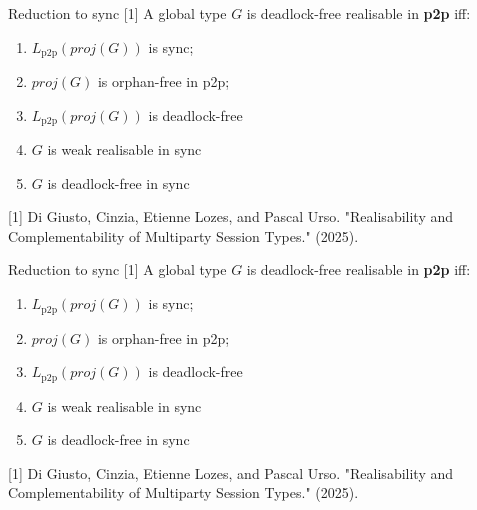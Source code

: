 \documentclass{beamer}
\begin{document}



\begin{frame}{Reduction to sync [1]}
	\vspace{1.5cm}
	A global type $G$ is deadlock-free realisable in \textbf{p2p} iff:
	\begin{enumerate}
		\item $L_{\text{p2p}}(proj(G))$ is sync;
		\item $proj(G)$ is orphan-free in p2p; %
		\item $L_{\text{p2p}}(proj(G))$ is deadlock-free
		\item $G$ is weak realisable in sync
		\item $G$ is deadlock-free in sync
	\end{enumerate}
	
	\vspace{1.5cm}

	\small{[1] Di Giusto, Cinzia, Etienne Lozes, and Pascal Urso. "Realisability and Complementability of Multiparty Session Types." (2025).}
\end{frame}

\begin{frame}{Reduction to sync [1]}
	\vspace{1.5cm}
	A global type $G$ is deadlock-free realisable in \textbf{p2p} iff:
	\begin{enumerate}
		\item $L_{\text{p2p}}(proj(G))$ is sync;
		\item $proj(G)$ is orphan-free in p2p; %
		\item $L_{\text{p2p}}(proj(G))$ is deadlock-free
		\item $G$ is weak realisable in sync \hspace{4mm} \scalebox{1.5}{{\color{red}$\longleftarrow$}}
		\item $G$ is deadlock-free in sync 
	\end{enumerate}
	
	\vspace{1.5cm}

	\small{[1] Di Giusto, Cinzia, Etienne Lozes, and Pascal Urso. "Realisability and Complementability of Multiparty Session Types." (2025).}
\end{frame}
\end{document}
